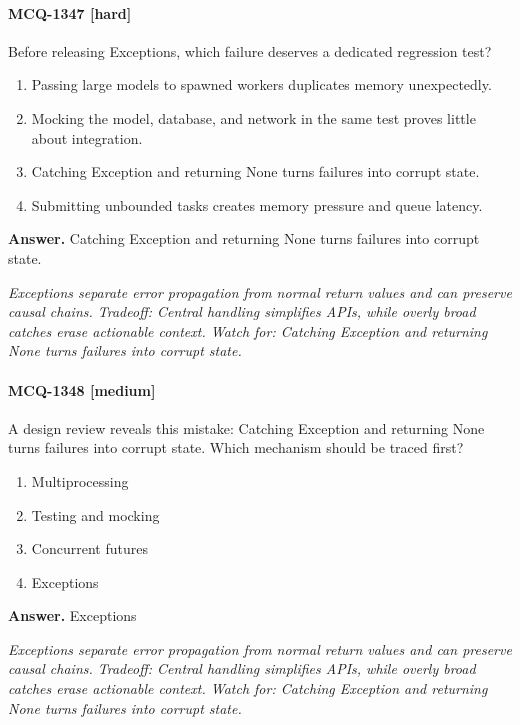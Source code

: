 \paragraph{MCQ-1347 [hard]} Before releasing Exceptions, which failure deserves a dedicated regression test?
\begin{enumerate}[label=\Alph*.]
\item Passing large models to spawned workers duplicates memory unexpectedly.
\item Mocking the model, database, and network in the same test proves little about integration.
\item Catching Exception and returning None turns failures into corrupt state.
\item Submitting unbounded tasks creates memory pressure and queue latency.
\end{enumerate}
\noindent\textbf{Answer.} Catching Exception and returning None turns failures into corrupt state.
\par\textit{Exceptions separate error propagation from normal return values and can preserve causal chains. Tradeoff: Central handling simplifies APIs, while overly broad catches erase actionable context. Watch for: Catching Exception and returning None turns failures into corrupt state.}
\paragraph{MCQ-1348 [medium]} A design review reveals this mistake: Catching Exception and returning None turns failures into corrupt state. Which mechanism should be traced first?
\begin{enumerate}[label=\Alph*.]
\item Multiprocessing
\item Testing and mocking
\item Concurrent futures
\item Exceptions
\end{enumerate}
\noindent\textbf{Answer.} Exceptions
\par\textit{Exceptions separate error propagation from normal return values and can preserve causal chains. Tradeoff: Central handling simplifies APIs, while overly broad catches erase actionable context. Watch for: Catching Exception and returning None turns failures into corrupt state.}
